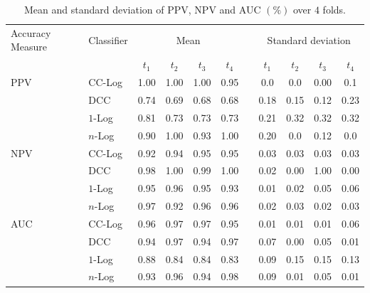 \documentclass[a4paper,11pt]{article}
\newif\ifxyz
\let\ifxyz\iffalse
\begin{document}
\begin{table}[!htb]
	\centering
	\begin{tabular}{llccccccccc}
		\toprule
		Accuracy Measure & Classifier & \multicolumn{4}{c}{Mean} &       & \multicolumn{4}{c}{Standard deviation}                                            \\
		\cmidrule{3-6} \cmidrule{8-11}
		                 &            & $t_1$                    & $t_2$ & $t_3$                                  & $t_4$ &  & $t_1$ & $t_2$ & $t_3$ & $t_4$ \\
		\midrule
		PPV              & CC-Log     & 1.00                     & 1.00  & 1.00                                   & 0.95  &  & 0.0   & 0.0   & 0.00  & 0.1   \\
		\ifxyz           & DCC        & 0.74                     & 0.69  & 0.68                                   & 0.68  &  & 0.18  & 0.15  & 0.12  & 0.23  \\ \fi
		                 & $1$-Log    & 0.81                     & 0.73  & 0.73                                   & 0.73  &  & 0.21  & 0.32  & 0.32  & 0.32  \\
		                 & $n$-Log    & 0.90                     & 1.00  & 0.93                                   & 1.00  &  & 0.20  & 0.0   & 0.12  & 0.0   \\
		\midrule
		NPV              & CC-Log     & 0.92                     & 0.94  & 0.95                                   & 0.95  &  & 0.03  & 0.03  & 0.03  & 0.03  \\
		\ifxyz           & DCC        & 0.98                     & 1.00  & 0.99                                   & 1.00  &  & 0.02  & 0.00  & 1.00  & 0.00  \\ \fi
		                 & $1$-Log    & 0.95                     & 0.96  & 0.95                                   & 0.93  &  & 0.01  & 0.02  & 0.05  & 0.06  \\
		                 & $n$-Log    & 0.97                     & 0.92  & 0.96                                   & 0.96  &  & 0.02  & 0.03  & 0.02  & 0.03  \\
		\midrule
		AUC              & CC-Log     & 0.96                     & 0.97  & 0.97                                   & 0.95  &  & 0.01  & 0.01  & 0.01  & 0.06  \\
		\ifxyz           & DCC        & 0.94                     & 0.97  & 0.94                                   & 0.97  &  & 0.07  & 0.00  & 0.05  & 0.01  \\ \fi
		                 & $1$-Log    & 0.88                     & 0.84  & 0.84                                   & 0.83  &  & 0.09  & 0.15  & 0.15  & 0.13  \\
		                 & $n$-Log    & 0.93                     & 0.96  & 0.94                                   & 0.98  &  & 0.09  & 0.01  & 0.05  & 0.01  \\
		\bottomrule
	\end{tabular}
	\caption{Mean and standard deviation of PPV, NPV and AUC $(\%)$ over $4$ folds.}
  \label{tab:AverageAccuracyReal}
\end{table}
\end{document}
